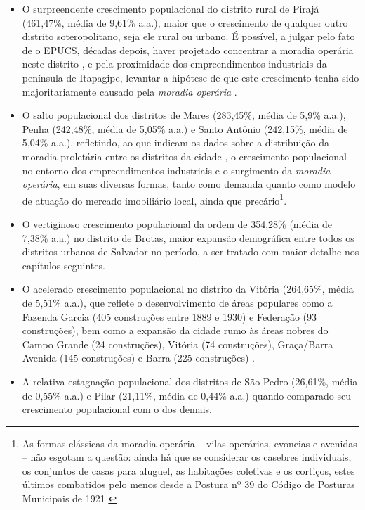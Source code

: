 \begin{itemize}
\item O surpreendente crescimento populacional do distrito rural de Pirajá (461,47\%, média de 9,61\% a.a.), maior que o crescimento de qualquer outro distrito soteropolitano, seja ele rural ou urbano. É possível, a julgar pelo fato de o EPUCS, décadas depois, haver projetado concentrar a moradia operária neste distrito \cite{PREFEITURA1978,sampaio_formas_1999}, e pela proximidade dos empreendimentos industriais da península de Itapagipe, levantar a hipótese de que este crescimento tenha sido majoritariamente causado pela \textit{moradia operária} \cite{cardoso_vilas_1991}.
\item O salto populacional dos distritos de Mares (283,45\%, média de 5,9\% a.a.), Penha (242,48\%, média de 5,05\% a.a.) e Santo Antônio (242,15\%, média de 5,04\% a.a.), refletindo, ao que indicam os dados sobre a distribuição da moradia proletária entre os distritos da cidade \cite[p.~126]{cardoso_vilas_1991}, o crescimento populacional no entorno dos empreendimentos industriais e o surgimento da \textit{moradia operária}, em suas diversas formas, tanto como demanda quanto como modelo de atuação do mercado imobiliário local, ainda que precário\footnote{As formas clássicas da moradia operária -- vilas operárias, evoneias e avenidas -- não esgotam a questão: ainda há que se considerar os casebres individuais, os conjuntos de casas para aluguel, as habitações coletivas e os cortiços, estes últimos combatidos pelo menos desde a Postura nº 39 do Código de Posturas Municipais de 1921 \cite{PREFEITURA1921}}.
\item O vertiginoso crescimento populacional da ordem de 354,28\% (média de 7,38\% a.a.) no distrito de Brotas, maior expansão demográfica entre todos os distritos urbanos de Salvador no período, a ser tratado com maior detalhe nos capítulos seguintes.
\item O acelerado crescimento populacional no distrito da Vitória (264,65\%, média de 5,51\% a.a.), que reflete o desenvolvimento de áreas populares como a Fazenda Garcia (405 construções entre 1889 e 1930) e Federação (93 construções), bem como a expansão da cidade rumo às áreas nobres do Campo Grande (24 construções), Vitória (74 construções), Graça/Barra Avenida (145 construções) e Barra (225 construções) \cite[p.~295]{almeida_victoria_1997}.
\item A relativa estagnação populacional dos distritos de São Pedro (26,61\%, média de 0,55\% a.a.) e Pilar (21,11\%, média de 0,44\% a.a.) quando comparado seu crescimento populacional com o dos demais.

\end{itemize}
